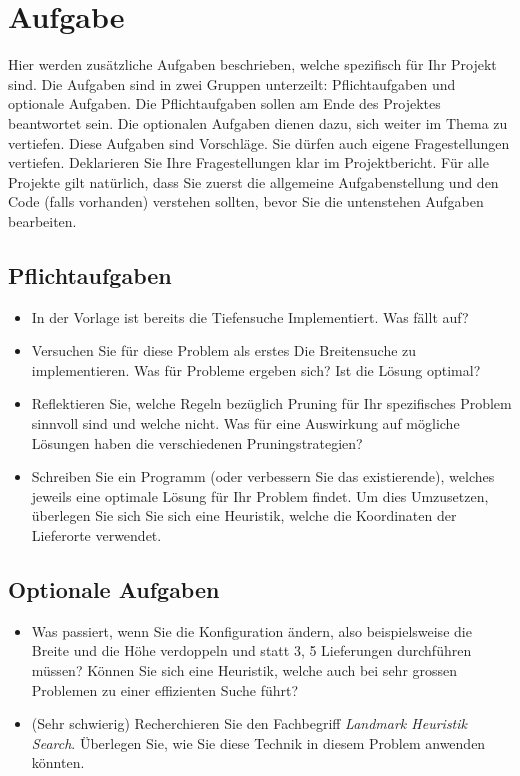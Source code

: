 \documentclass[a4paper,11pt,german,notitlepage]{report}
\begin{document}
\section*{Aufgabe}
Hier werden zusätzliche Aufgaben beschrieben, welche spezifisch für Ihr Projekt sind.
Die Aufgaben sind in zwei Gruppen unterzeilt: Pflichtaufgaben und optionale Aufgaben.
Die Pflichtaufgaben sollen am Ende des Projektes beantwortet sein.
Die optionalen Aufgaben dienen dazu, sich weiter im Thema zu vertiefen.
Diese Aufgaben sind Vorschläge. Sie dürfen auch eigene Fragestellungen vertiefen.
Deklarieren Sie Ihre Fragestellungen klar im Projektbericht.
Für alle Projekte gilt natürlich, dass Sie zuerst die allgemeine Aufgabenstellung und den Code (falls vorhanden) verstehen sollten, bevor Sie die untenstehen Aufgaben bearbeiten.
\subsection*{Pflichtaufgaben}
\begin{itemize}
    \item In der Vorlage ist bereits die Tiefensuche Implementiert. Was fällt auf?
    \item Versuchen Sie für diese Problem als erstes Die Breitensuche zu implementieren. Was für Probleme ergeben sich? Ist die Lösung optimal?
    \item Reflektieren Sie, welche Regeln bezüglich Pruning für Ihr spezifisches Problem sinnvoll sind und welche nicht. Was für eine Auswirkung auf mögliche Lösungen haben die verschiedenen Pruningstrategien?
    \item Schreiben Sie ein Programm (oder verbessern Sie das existierende), welches jeweils eine optimale Lösung für Ihr Problem findet. Um dies Umzusetzen, überlegen Sie sich Sie sich eine Heuristik, welche die Koordinaten der Lieferorte verwendet.
\end{itemize}
\subsection*{Optionale Aufgaben}
\begin{itemize}
    \item Was passiert, wenn Sie die Konfiguration ändern, also beispielsweise die Breite und die Höhe verdoppeln und statt 3, 5 Lieferungen durchführen müssen? Können Sie sich eine Heuristik, welche auch bei sehr grossen Problemen zu einer effizienten Suche führt?
    \item (Sehr schwierig) Recherchieren Sie den Fachbegriff \textit{Landmark Heuristik Search}. Überlegen Sie, wie Sie diese Technik in diesem Problem anwenden könnten.
\end{itemize}
\end{document}
